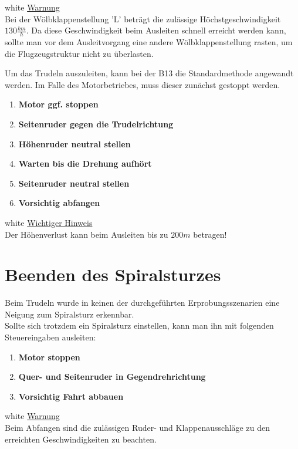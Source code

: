 \begin{color}{white} 
\underline{Warnung}\\
Bei der Wölbklappenstellung 'L' beträgt die zulässige Höchstgeschwindigkeit $130\frac{km}{h}$. Da diese Geschwindigkeit beim Ausleiten schnell erreicht werden kann, sollte man vor dem Ausleitvorgang eine andere Wölbklappenstellung rasten, um die Flugzeugstruktur nicht zu überlasten.\\
\end{color}


Um das Trudeln auszuleiten, kann bei der B13 die Standardmethode angewandt werden. Im Falle des Motorbetriebes, muss dieser zunächst gestoppt werden.

\begin{enumerate}
\item \textbf{Motor ggf. stoppen}
\item \textbf{Seitenruder gegen die Trudelrichtung}
\item \textbf{Höhenruder neutral stellen}
\item \textbf{Warten bis die Drehung aufhört}
\item \textbf{Seitenruder neutral stellen}
\item \textbf{Vorsichtig abfangen}
\end{enumerate}


\begin{color}{white}
\underline{Wichtiger Hinweis}\\
Der Höhenverlust kann beim Ausleiten bis zu $200m$ betragen!
\end{color}

\section{Beenden des Spiralsturzes}
Beim Trudeln wurde in keinen der durchgeführten Erprobungsszenarien eine Neigung zum Spiralsturz erkennbar.\\
Sollte sich trotzdem ein Spiralsturz einstellen, kann man ihn mit folgenden Steuereingaben ausleiten:
\begin{enumerate}
\item \textbf{Motor stoppen}
\item \textbf{Quer- und Seitenruder in Gegendrehrichtung}
\item \textbf{Vorsichtig Fahrt abbauen}
\end{enumerate}

\begin{color}{white}
\underline{Warnung}\\
Beim Abfangen sind die zulässigen Ruder- und Klappenausschläge zu den erreichten Geschwindigkeiten zu beachten.
\end{color}

